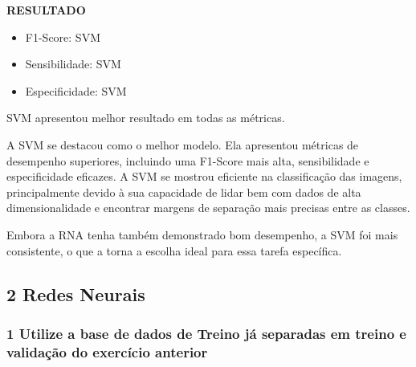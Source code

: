 \noindent\textbf{RESULTADO}
\begin{itemize}
    \item F1-Score: SVM
    \item Sensibilidade: SVM
    \item Especificidade: SVM
\end{itemize}

SVM apresentou melhor resultado em todas as métricas.

A SVM se destacou como o melhor modelo. Ela apresentou métricas de desempenho superiores, incluindo uma F1-Score mais alta, sensibilidade e especificidade eficazes. A SVM se mostrou eficiente na classificação das imagens, principalmente devido à sua capacidade de lidar bem com dados de alta dimensionalidade e encontrar margens de separação mais precisas entre as classes.

Embora a RNA tenha também demonstrado bom desempenho, a SVM foi mais consistente, o que a torna a escolha ideal para essa tarefa específica.

\subsection*{\textbf{2 Redes Neurais}}
\subsubsection*{1 Utilize a base de dados de Treino já separadas em treino e validação do exercício anterior}
